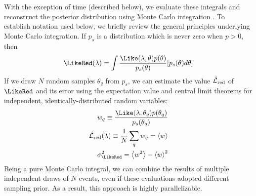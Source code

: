 With the exception of time (described below), we evaluate these integrals and reconstruct the posterior distribution using Monte Carlo integration
\cite{book-mm-NumericalRecipies,peter1978new}.   To establish notation used below, we briefly review the general principles  underlying Monte Carlo
integration.  If $p_s$ is a distribution which is never zero when $p>0$, then 
\begin{eqnarray}
\LikeRed(\lambda) = \int \frac{\Like(\lambda,\theta) p(\theta)}{p_s(\theta)} [p_s(\theta) d\theta]
\end{eqnarray}
% 
If we draw $N$ random samples $\theta_q$ from $p_s$, we can estimate the value $\hat{{\cal L}}_{\rm red}$ of $\LikeRed$ and its error using the
expectation value and central limit theorems for independent, identically-distributed random variables:
\begin{eqnarray}
w_q \equiv \frac{\Like(\lambda,\theta_q) p(\theta_q)}{p_s(\theta_q)} \\
\hat{{\cal L}}_{\rm red}(\lambda) \equiv \frac{1}{N} \sum_q w_q = \left<w\right> \\
\sigma_{\LikeRed}^2 = \left<w^2\right> - \left<w\right>^2
\end{eqnarray}
Being a pure Monte Carlo integral, we can  combine the results of multiple independent draws of $N$ events, even if these
evaluations adopted different sampling prior.  As a result, this approach is highly parallelizable.  


